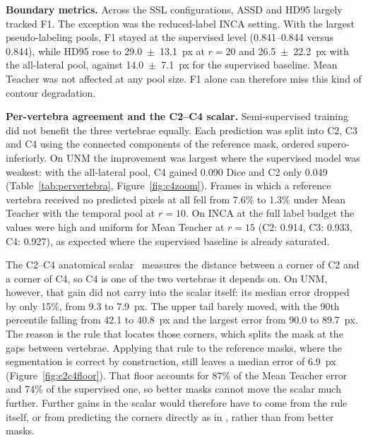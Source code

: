 \documentclass[
  msc,
  american
]{ThesisPUC_v2}
\begin{document}
\textbf{Boundary metrics.} Across the SSL configurations, ASSD and HD95 largely tracked F1. The exception was the reduced-label INCA setting. With the largest pseudo-labeling pools, F1 stayed at the supervised level (0.841--0.844 versus 0.844), while HD95 rose to 29.0~$\pm$~13.1~px at $r{=}20$ and 26.5~$\pm$~22.2~px with the all-lateral pool, against 14.0~$\pm$~7.1~px for the supervised baseline. Mean Teacher was not affected at any pool size. F1 alone can therefore miss this kind of contour degradation.

\textbf{Per-vertebra agreement and the C2--C4 scalar.} Semi-supervised training did not benefit the three vertebrae equally. Each prediction was split into C2, C3 and C4 using the connected components of the reference mask, ordered supero-inferiorly. On UNM the improvement was largest where the supervised model was weakest: with the all-lateral pool, C4 gained 0.090 Dice and C2 only 0.049 (Table~\ref{tab:pervertebra}, Figure~\ref{fig:c4zoom}). Frames in which a reference vertebra received no predicted pixels at all fell from 7.6\% to 1.3\% under Mean Teacher with the temporal pool at $r{=}10$. On INCA at the full label budget the values were high and uniform for Mean Teacher at $r{=}15$ (C2: 0.914, C3: 0.933, C4: 0.927), as expected where the supervised baseline is already saturated.

The C2--C4 anatomical scalar~\citep{ref_molfenter} measures the distance between a corner of C2 and a corner of C4, so C4 is one of the two vertebrae it depends on. On UNM, however, that gain did not carry into the scalar itself: its median error dropped by only 15\%, from 9.3 to 7.9~px. The upper tail barely moved, with the 90th percentile falling from 42.1 to 40.8~px and the largest error from 90.0 to 89.7~px. The reason is the rule that locates those corners, which splits the mask at the gaps between vertebrae. Applying that rule to the reference masks, where the segmentation is correct by construction, still leaves a median error of 6.9~px (Figure~\ref{fig:c2c4floor}). That floor accounts for 87\% of the Mean Teacher error and 74\% of the supervised one, so better masks cannot move the scalar much further. Further gains in the scalar would therefore have to come from the rule itself, or from predicting the corners directly as in \citet{ref_zhang2021}, rather than from better masks.
\end{document}
